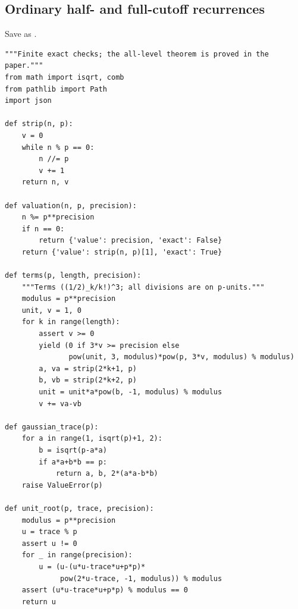 \documentclass[11pt,a4paper]{article}
\begin{document}
\subsection{Ordinary half- and full-cutoff recurrences}
Save as .
\begin{lstlisting}
"""Finite exact checks; the all-level theorem is proved in the paper."""
from math import isqrt, comb
from pathlib import Path
import json

def strip(n, p):
    v = 0
    while n % p == 0:
        n //= p
        v += 1
    return n, v

def valuation(n, p, precision):
    n %= p**precision
    if n == 0:
        return {'value': precision, 'exact': False}
    return {'value': strip(n, p)[1], 'exact': True}

def terms(p, length, precision):
    """Terms ((1/2)_k/k!)^3; all divisions are on p-units."""
    modulus = p**precision
    unit, v = 1, 0
    for k in range(length):
        assert v >= 0
        yield (0 if 3*v >= precision else
               pow(unit, 3, modulus)*pow(p, 3*v, modulus) % modulus)
        a, va = strip(2*k+1, p)
        b, vb = strip(2*k+2, p)
        unit = unit*a*pow(b, -1, modulus) % modulus
        v += va-vb

def gaussian_trace(p):
    for a in range(1, isqrt(p)+1, 2):
        b = isqrt(p-a*a)
        if a*a+b*b == p:
            return a, b, 2*(a*a-b*b)
    raise ValueError(p)

def unit_root(p, trace, precision):
    modulus = p**precision
    u = trace % p
    assert u != 0
    for _ in range(precision):
        u = (u-(u*u-trace*u+p*p)*
             pow(2*u-trace, -1, modulus)) % modulus
    assert (u*u-trace*u+p*p) % modulus == 0
    return u


\end{lstlisting}
\end{document}
